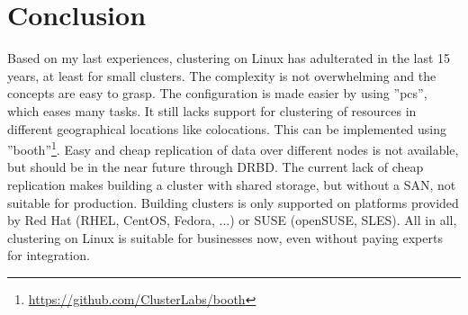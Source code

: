 


\section{Conclusion}
Based on my last experiences, clustering on Linux has adulterated in the 
last 15 years, at least for small clusters. The complexity is not
overwhelming and the concepts are easy to grasp. The configuration is made
easier by using ''pcs'', which eases many tasks. It still lacks support
for clustering of resources in different geographical locations like colocations.
This can be implemented using ''booth''\footnote{\url{https://github.com/ClusterLabs/booth}}.
Easy and cheap replication of data over different nodes is not available, but should
be in the near future through \ac{DRBD}. The current lack of cheap replication
makes building a cluster with shared storage, but without a SAN, not suitable
for production. Building clusters is only supported on platforms provided
by Red Hat (RHEL, CentOS, Fedora, ...) or SUSE (openSUSE, SLES).
All in all, clustering on Linux is suitable for businesses now, even without
paying experts for integration.
